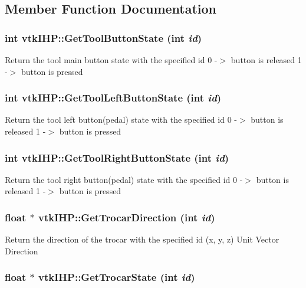 \subsection{Member Function Documentation}
\hypertarget{classvtkIHP_a5679a7f0539274650ba046cbf5e0535a}{
\subsubsection[{GetToolButtonState}]{\setlength{\rightskip}{0pt plus 5cm}int vtkIHP::GetToolButtonState (int {\em id})}}
\label{classvtkIHP_a5679a7f0539274650ba046cbf5e0535a}
Return the tool main button state with the specified id 0 -\/$>$ button is released 1 -\/$>$ button is pressed \hypertarget{classvtkIHP_af7a915155ec7b4e77ea788080ec7bda9}{
\subsubsection[{GetToolLeftButtonState}]{\setlength{\rightskip}{0pt plus 5cm}int vtkIHP::GetToolLeftButtonState (int {\em id})}}
\label{classvtkIHP_af7a915155ec7b4e77ea788080ec7bda9}
Return the tool left button(pedal) state with the specified id 0 -\/$>$ button is released 1 -\/$>$ button is pressed \hypertarget{classvtkIHP_a3b90d186241d7839a7b17fcf758ca680}{
\subsubsection[{GetToolRightButtonState}]{\setlength{\rightskip}{0pt plus 5cm}int vtkIHP::GetToolRightButtonState (int {\em id})}}
\label{classvtkIHP_a3b90d186241d7839a7b17fcf758ca680}
Return the tool right button(pedal) state with the specified id 0 -\/$>$ button is released 1 -\/$>$ button is pressed \hypertarget{classvtkIHP_a51ffd1fb138d362a766df8de9e5ccbdb}{
\subsubsection[{GetTrocarDirection}]{\setlength{\rightskip}{0pt plus 5cm}float $\ast$ vtkIHP::GetTrocarDirection (int {\em id})}}
\label{classvtkIHP_a51ffd1fb138d362a766df8de9e5ccbdb}
Return the direction of the trocar with the specified id (x, y, z) Unit Vector Direction \hypertarget{classvtkIHP_aea98689cc76883453f1b0099609cdaac}{
\subsubsection[{GetTrocarState}]{\setlength{\rightskip}{0pt plus 5cm}float $\ast$ vtkIHP::GetTrocarState (int {\em id})}}
\label{classvtkIHP_aea98689cc76883453f1b0099609cdaac}


